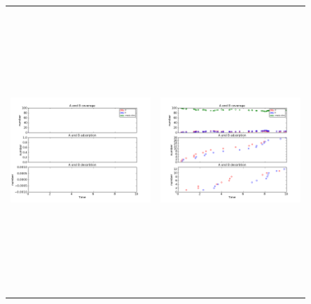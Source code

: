 \documentclass[11pt]{article}
\begin{document}
\setlength{\unitlength}{1in}
\begin{figure}[h!]
\begin{tabular}{cc}
\includegraphics[width=3.5in, height=4.2in]{./coadsorb/AtoBcoadsorb10x10_101_absorb2x__Ea10E3_Ed5E3_1.png} &
\includegraphics[width=3.5in, height=4.2in]{./coadsorb/AtoBcoadsorb10x10_201_absorb2x__Ea10E3_Ed5E3_1.png} \\

\end{tabular}
\end{figure}
\end{document}
